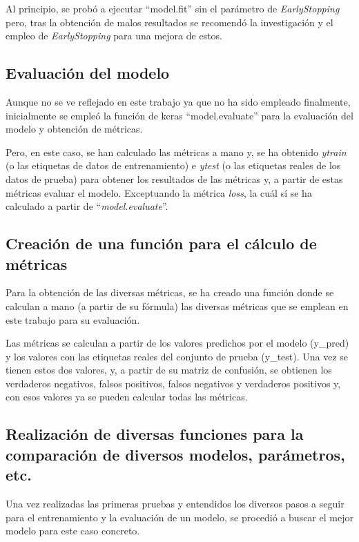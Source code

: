 Al principio, se probó a ejecutar ``model.fit'' sin el parámetro de \textit{EarlyStopping} pero, tras la obtención de malos resultados se recomendó la investigación y el empleo de \textit{EarlyStopping} para una mejora de estos.

\subsection{Evaluación del modelo}

Aunque no se ve reflejado en este trabajo ya que no ha sido empleado finalmente, inicialmente se empleó la función de keras ``model.evaluate'' para la evaluación del modelo y obtención de métricas.

Pero, en este caso, se han calculado las métricas a mano y, se ha obtenido \textit{ytrain} (o las etiquetas de datos de entrenamiento) e \textit{ytest} (o las etiquetas reales de los datos de prueba) para obtener los resultados de las métricas y, a partir de estas métricas evaluar el modelo. Exceptuando la métrica \textit{loss}, la cuál sí se ha calculado a partir de ``\textit{model.evaluate}''.

\subsection{Creación de una función para el cálculo de métricas}

Para la obtención de las diversas métricas, se ha creado una función donde se calculan a mano (a partir de su fórmula) las diversas métricas que se emplean en este trabajo para su evaluación.

Las métricas se calculan a partir de los valores predichos por el modelo (y\_pred) y los valores con las etiquetas reales del conjunto de prueba (y\_test). Una vez se tienen estos dos valores, y, a partir de su matriz de confusión, se obtienen los verdaderos negativos, falsos positivos, falsos negativos y verdaderos positivos y, con esos valores ya se pueden calcular todas las métricas.

\subsection{Realización de diversas funciones para la comparación de diversos modelos, parámetros, etc.}

Una vez realizadas las primeras pruebas y entendidos los diversos pasos a seguir para el entrenamiento y la evaluación de un modelo, se procedió a buscar el mejor modelo para este caso concreto.

